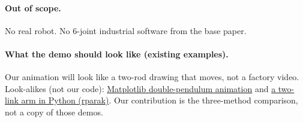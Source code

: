 \documentclass[11pt,a4paper]{article}
\begin{document}
\paragraph{Out of scope.}
No real robot. No 6-joint industrial software from the base paper.

\paragraph{What the demo should look like (existing examples).}
Our animation will look like a two-rod drawing that moves, not a factory video.
Look-alikes (not our code):
\href{https://matplotlib.org/stable/gallery/animation/double_pendulum.html}{Matplotlib double-pendulum animation}
and
\href{https://github.com/rparak/2-Link_Manipulator}{a two-link arm in Python (rparak)}.
Our contribution is the three-method comparison, not a copy of those demos.
\end{document}
